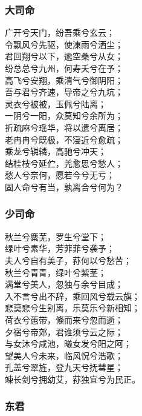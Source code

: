 \documentclass[]{article}
\begin{document}
\hypertarget{header-n36}{%
\subsubsection{大司命}\label{header-n36}}

广开兮天门，纷吾乘兮玄云；\\
令飘风兮先驱，使涷雨兮洒尘；\\
君回翔兮以下，逾空桑兮从女；\\
纷总总兮九州，何寿夭兮在予；\\
高飞兮安翔，乘清气兮御阴阳；\\
吾与君兮齐速，导帝之兮九坑；\\
灵衣兮被被，玉佩兮陆离；\\
一阴兮一阳，众莫知兮余所为；\\
折疏麻兮瑶华，将以遗兮离居；\\
老冉冉兮既极，不寖近兮愈疏；\\
乘龙兮辚辚，高驰兮冲天；\\
结桂枝兮延伫，羌愈思兮愁人；\\
愁人兮奈何，愿若今兮无亏；\\
固人命兮有当，孰离合兮何为？

\hypertarget{header-n41}{%
\subsubsection{少司命}\label{header-n41}}

秋兰兮麋芜，罗生兮堂下；\\
绿叶兮素华，芳菲菲兮袭予；\\
夫人兮自有美子，荪何以兮愁苦；\\
秋兰兮青青，绿叶兮紫茎；\\
满堂兮美人，忽独与余兮目成；\\
入不言兮出不辞，乘回风兮载云旗；\\
悲莫悲兮生别离，乐莫乐兮新相知；\\
荷衣兮蕙带，儵而来兮忽而逝；\\
夕宿兮帝郊，君谁须兮云之际；\\
与女沐兮咸池，曦女发兮阳之阿；\\
望美人兮未来，临风怳兮浩歌；\\
孔盖兮翠旌，登九天兮抚彗星；\\
竦长剑兮拥幼艾，荪独宜兮为民正。

\hypertarget{header-n46}{%
\subsubsection{东君}\label{header-n46}}
\end{document}
